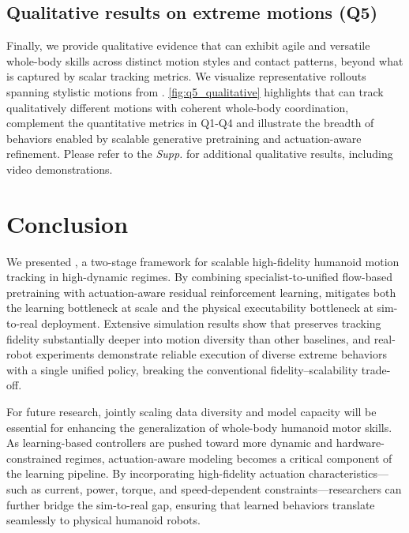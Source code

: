 

\subsection{Qualitative results on extreme motions (Q5)}
\label{sec:q5_qualitative}

Finally, we provide qualitative evidence that \model can exhibit agile and versatile whole-body skills across distinct motion styles and contact patterns, beyond what is captured by scalar tracking metrics.
We visualize representative rollouts spanning stylistic motions from \dataset. \cref{fig:q5_qualitative} highlights that \model can track qualitatively different motions with coherent whole-body coordination, complement the quantitative metrics in Q1-Q4 and illustrate the breadth of behaviors enabled by scalable generative pretraining and actuation-aware refinement. Please refer to the \textit{Supp.} for additional qualitative results, including video demonstrations.




\section{Conclusion} 
\label{sec:conclusion}
We presented \model, a two-stage framework for scalable high-fidelity humanoid motion tracking in high-dynamic regimes. By combining specialist-to-unified flow-based pretraining with actuation-aware residual reinforcement learning, \model mitigates both the learning bottleneck at scale and the physical executability bottleneck at sim-to-real deployment. Extensive simulation results show that \model preserves tracking fidelity substantially deeper into motion diversity than other baselines, and real-robot experiments demonstrate reliable execution of diverse extreme behaviors with a single unified policy, breaking the conventional fidelity--scalability trade-off.

For future research, jointly scaling data diversity and model capacity will be essential for enhancing the generalization of whole-body humanoid motor skills. As learning-based controllers are pushed toward more dynamic and hardware-constrained regimes, actuation-aware modeling becomes a critical component of the learning pipeline. By incorporating high-fidelity actuation characteristics—such as current, power, torque, and speed-dependent constraints—researchers can further bridge the sim-to-real gap, ensuring that learned behaviors translate seamlessly to physical humanoid robots.

